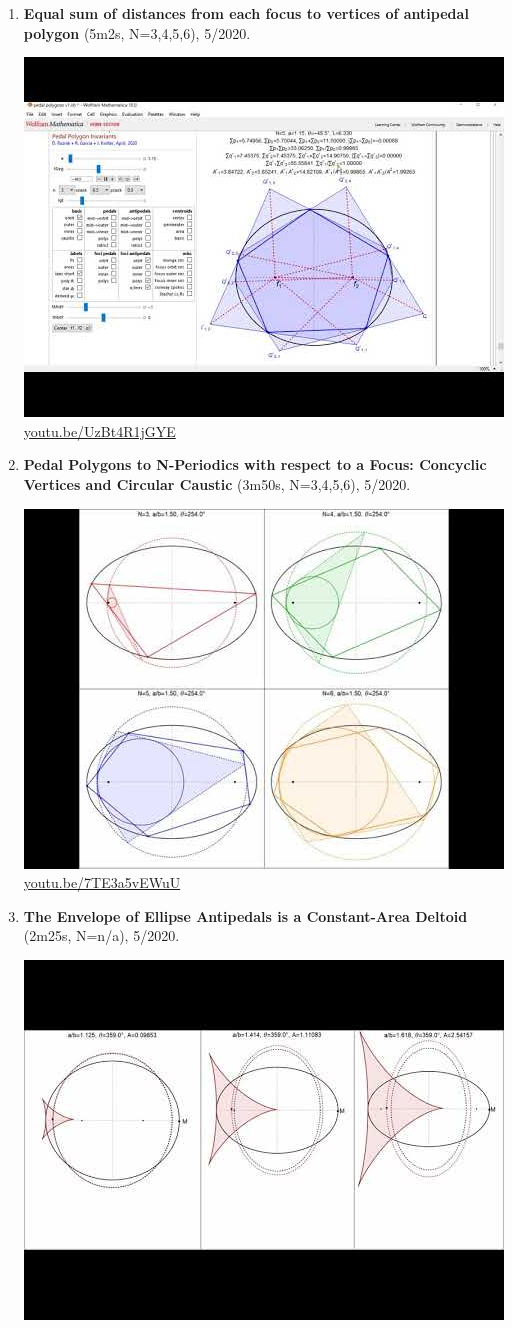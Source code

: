 \documentclass[12pt]{amsart}
\begin{document}
\begin{enumerate}[resume]
\item \textbf{Equal sum of distances from each focus to vertices of antipedal polygon} (5m2s, N=3,4,5,6), 5/2020. 
\begin{center}\includegraphics[width=.5\textwidth]{pics/UzBt4R1jGYE.jpg} \\ 
\href{https://youtu.be/UzBt4R1jGYE}{\url{youtu.be/UzBt4R1jGYE}}\end{center}
% 
\item \textbf{Pedal Polygons to N-Periodics with respect to a Focus: Concyclic Vertices and Circular Caustic} (3m50s, N=3,4,5,6), 5/2020. 
\begin{center}\includegraphics[width=.5\textwidth]{pics/7TE3a5vEWuU.jpg} \\ 
\href{https://youtu.be/7TE3a5vEWuU}{\url{youtu.be/7TE3a5vEWuU}}\end{center}
% 
\item \textbf{The Envelope of Ellipse Antipedals is a Constant-Area Deltoid} (2m25s, N=n/a), 5/2020. 
\begin{center}\includegraphics[width=.5\textwidth]{pics/wetmchfY5jI.jpg} \\ 

\end{center}
\end{enumerate}
\end{document}
